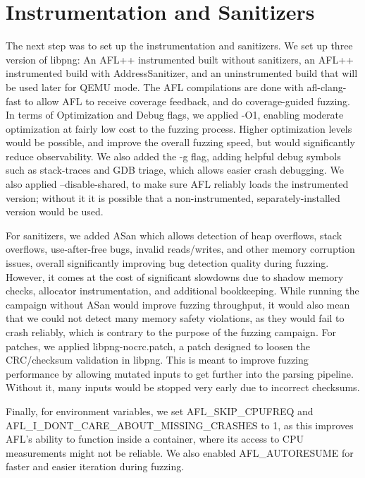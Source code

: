 \documentclass[letterpaper,twocolumn,10pt]{article}
\begin{document}

\section{Instrumentation and Sanitizers}

The next step was to set up the instrumentation and sanitizers. We set up three version of libpng: An AFL++ instrumented built without sanitizers, an AFL++ instrumented build with AddressSanitizer, and an uninstrumented build that will be used later for QEMU mode. The AFL compilations are done with afl-clang-fast to allow AFL to receive coverage feedback, and do coverage-guided fuzzing.  In terms of Optimization and Debug flags, we applied -O1, enabling moderate optimization at fairly low cost to the fuzzing process. Higher optimization levels would be possible, and improve the overall fuzzing speed, but would significantly reduce observability. We also added the -g flag, adding helpful debug symbols such as stack-traces and GDB triage, which allows easier crash debugging. We also applied --disable-shared, to make sure AFL reliably loads the instrumented version; without it it is possible that a non-instrumented, separately-installed version would be used.

For sanitizers, we added ASan which allows detection of heap overflows, stack overflows, use-after-free bugs, invalid reads/writes, and other memory corruption issues, overall significantly improving bug detection quality during fuzzing. However, it comes at the cost of significant slowdowns due to shadow memory checks, allocator instrumentation, and additional bookkeeping. While running the campaign without ASan would improve fuzzing throughput, it would also mean that we could not detect many memory safety violations, as they would fail to crash reliably, which is contrary to the purpose of the fuzzing campaign.
For patches, we applied libpng-nocrc.patch, a patch designed to loosen the CRC/checksum validation in libpng. This is meant to improve fuzzing performance by allowing mutated inputs to get further into the parsing pipeline. Without it, many inputs would be stopped very early due to incorrect checksums.

Finally, for environment variables, we set AFL\_SKIP\_CPUFREQ and AFL\_I\_DONT\_CARE\_ABOUT\_MISSING\_CRASHES to 1, as this improves AFL's ability to function inside a container, where its access to CPU measurements might not be reliable. We also enabled AFL\_AUTORESUME for faster and easier iteration during fuzzing.
\end{document}
